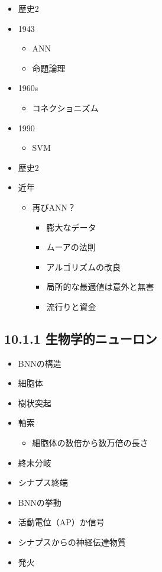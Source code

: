 \begin{itemize}
\tightlist
\item
  歴史2
\item
  1943

  \begin{itemize}
  \tightlist
  \item
    ANN
  \item
    命題論理
  \end{itemize}
\item
  1960s

  \begin{itemize}
  \tightlist
  \item
    コネクショニズム
  \end{itemize}
\item
  1990

  \begin{itemize}
  \tightlist
  \item
    SVM
  \end{itemize}
\item
  歴史2
\item
  近年

  \begin{itemize}
  \tightlist
  \item
    再びANN？

    \begin{itemize}
    \tightlist
    \item
      膨大なデータ
    \item
      ムーアの法則
    \item
      アルゴリズムの改良
    \item
      局所的な最適値は意外と無害
    \item
      流行りと資金
    \end{itemize}
  \end{itemize}
\end{itemize}

\hypertarget{ux751fux7269ux5b66ux7684ux30cbux30e5ux30fcux30edux30f3}{%
\subsection{10.1.1
生物学的ニューロン}\label{ux751fux7269ux5b66ux7684ux30cbux30e5ux30fcux30edux30f3}}

\begin{itemize}
\item
  BNNの構造
\item
  細胞体
\item
  樹状突起
\item
  軸索

  \begin{itemize}
  \tightlist
  \item
    細胞体の数倍から数万倍の長さ
  \end{itemize}
\item
  終末分岐
\item
  シナプス終端
\item
  BNNの挙動
\item
  活動電位（AP）か信号
\item
  シナプスからの神経伝達物質
\item
  発火
\end{itemize}

